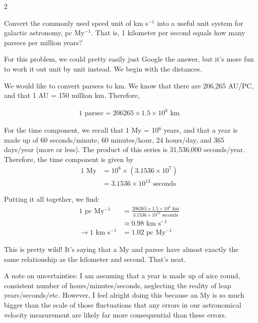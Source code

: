 \documentclass[12pt]{article}
\newenvironment{problem}[2][Problem]{\begin{trivlist}
\item[\hskip \labelsep {\bfseries #1}\hskip \labelsep {\bfseries #2.}]}{\end{trivlist}}
\newenvironment{answer}[2][Answer]{\begin{trivlist}
\item[\hskip \labelsep {\bfseries #1}\hskip \labelsep {\bfseries #2.}]}{\end{trivlist}}
\begin{document}
\begin{multicols*}{2}


\begin{problem}{1} Convert the commonly used speed unit of km s$^{-1}$ into a useful unit system for galactic astronomy, pc My$^{-1}$. That is, 1 kilometer per second equals how many parsecs per million years?

\end{problem}

\begin{answer}{1}
  For this problem, we could pretty easily just Google the answer, but it's more fun to work it out unit by unit instead. We begin with the distances. \bigskip

  We would like to convert parsecs to km. We know that there are 206,265 AU/PC, and that 1 AU = 150 million km. Therefore,

  \begin{align*}
    1 \text{ parsec} = 206265 \times 1.5 \times 10^8 \text{ km}
  \end{align*}

  For the time component, we recall that 1 My = 10$^{6}$ years, and that a year is made up of 60 seconds/minute, 60 minutes/hour, 24 hours/day, and 365 days/year (more or less). The product of this series is 31,536,000 seconds/year. Therefore, the time component is given by
  \begin{align*}
    1 \text{ My} &= 10^{6} \times (3.1536 \times 10^7) \\
                 &= 3.1536 \times 10^{13} \text{ seconds}
  \end{align*}

  Putting it all together, we find:
  \begin{align*}
    1 \text{ pc My$^{-1}$} &= \frac{206265 \times 1.5 \times 10^8 \text{ km}}{3.1536 \times 10^{13} \text{ seconds}} \\
      &\approx 0.98 \text{ km s$^{-1}$} \\
    \rightarrow 1 \text{ km s$^{-1}$} &= 1.02 \text{ pc My$^{-1}$}
  \end{align*}

  This is pretty wild! It's saying that a My and parsec have almost exactly the same relationship as the kilometer and second. That's neat. \bigskip

  A note on uncertainties: I am assuming that a year is made up of nice round, consistent number of hours/minutes/seconds, neglecting the reality of leap years/seconds/etc. However, I feel alright doing this because an My is so much bigger than the scale of those fluctuations that any errors in our astronomical velocity measurement are likely far more consequential than these errors. \bigskip
\end{answer}





\end{multicols*}
\end{document}
